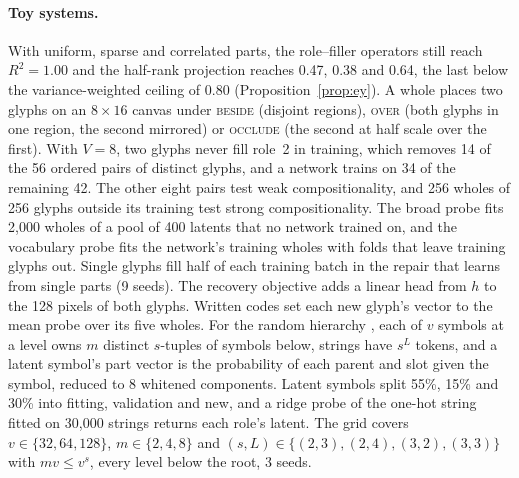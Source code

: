 \paragraph{Toy systems.} With uniform, sparse and correlated parts, the role--filler operators still reach $R^2 = 1.00$ and the half-rank projection reaches 0.47, 0.38 and 0.64, the last below the variance-weighted ceiling of 0.80 (Proposition~\ref{prop:ey}). A whole places two glyphs on an $8 \times 16$ canvas under \textsc{beside} (disjoint regions), \textsc{over} (both glyphs in one region, the second mirrored) or \textsc{occlude} (the second at half scale over the first). With $V = 8$, two glyphs never fill role~2 in training, which removes 14 of the 56 ordered pairs of distinct glyphs, and a network trains on 34 of the remaining 42. The other eight pairs test weak compositionality, and 256 wholes of 256 glyphs outside its training test strong compositionality. The broad probe fits 2{,}000 wholes of a pool of 400 latents that no network trained on, and the vocabulary probe fits the network's training wholes with folds that leave training glyphs out. Single glyphs fill half of each training batch in the repair that learns from single parts (9 seeds). The recovery objective adds a linear head from $h$ to the 128 pixels of both glyphs. Written codes set each new glyph's vector to the mean probe over its five wholes. For the random hierarchy \citep{cagnetta2024rhm}, each of $v$ symbols at a level owns $m$ distinct $s$-tuples of symbols below, strings have $s^L$ tokens, and a latent symbol's part vector is the probability of each parent and slot given the symbol, reduced to 8 whitened components. Latent symbols split 55\%, 15\% and 30\% into fitting, validation and new, and a ridge probe of the one-hot string fitted on 30{,}000 strings returns each role's latent. The grid covers $v \in \{32, 64, 128\}$, $m \in \{2, 4, 8\}$ and $(s, L) \in \{(2,3), (2,4), (3,2), (3,3)\}$ with $mv \le v^s$, every level below the root, 3 seeds.

